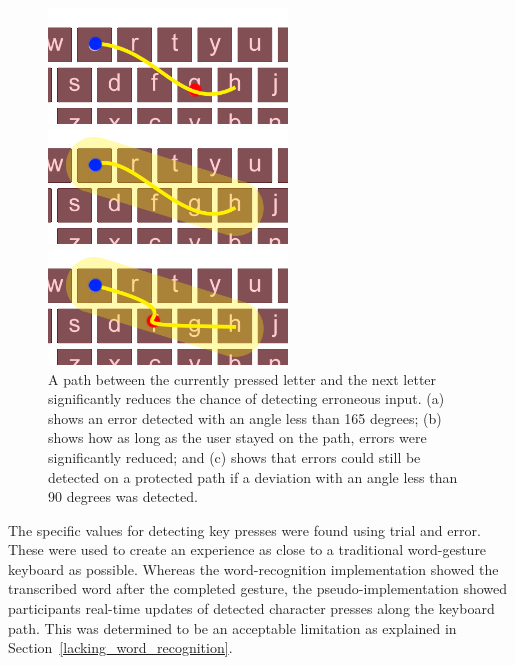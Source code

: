 \begin{figure}[!t]
	\centering
	\begin{minipage}[t]{3in}
		\includegraphics[width=2.5in]{Figures/fig_path_no_protection}
	\end{minipage}
	\begin{minipage}[t]{2.5in}
		\includegraphics[width=2.5in]{Figures/fig_path_no_error}
	\end{minipage}
	\begin{minipage}[t]{2.5in}
		\includegraphics[width=2.5in]{Figures/fig_path_with_error}
	\end{minipage}
	\caption[Protected Path Example]{A path between the currently pressed letter and the next letter significantly reduces the chance of detecting erroneous input. (a) shows an error detected with an angle less than 165 degrees; (b) shows how as long as the user stayed on the path, errors were significantly reduced; and (c) shows that errors could still be detected on a protected path if a deviation with an angle less than 90 degrees was detected.}
	\label{protected_path}
\end{figure}

The specific values for detecting key presses were found using trial and error. These were used to create an experience as close to a traditional word-gesture keyboard as possible. Whereas the word-recognition implementation showed the transcribed word after the completed gesture, the pseudo-implementation showed participants real-time updates of detected character presses along the keyboard path. This was determined to be an acceptable limitation as explained in Section~\ref{lacking_word_recognition}.

